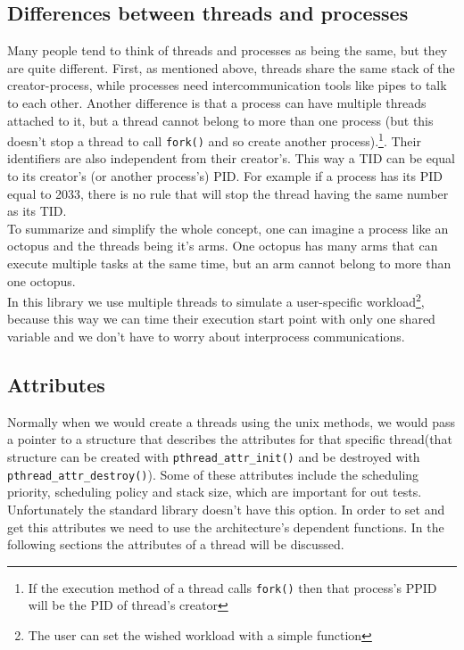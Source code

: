 \subsection{Differences between threads and processes} 
Many people tend to think of threads and processes as being the same, but they are quite different. First, as mentioned above, threads share the same stack of the creator-process, while processes need intercommunication tools like pipes to talk to each other. Another difference is that a process can have multiple threads attached to it, but a thread cannot belong to more than one process (but this doesn't stop a thread to call \texttt{fork()} and so create another process).\footnote{If the execution method of a thread calls \texttt{fork()} then that process's PPID will be the PID of thread's creator}. Their identifiers are also independent from their creator's. This way a TID can be equal to its creator's (or another process's) PID. For example if a process has its PID equal to 2033, there is no rule that will stop the thread having the same number as its TID. \\
To summarize and simplify the whole concept, one can imagine a process like an octopus and the threads being it's arms. One octopus has many arms that can execute multiple tasks at the same time, but an arm cannot belong to more than one octopus.\\
In this library we use multiple threads to simulate a user-specific workload\footnote{The user can set the wished workload with a simple function}, because this way we can time their execution start point with only one shared variable and we don't have to worry about interprocess communications. 
\subsection{Attributes}
Normally when we would create a threads using the unix methods, we would pass a pointer to a
structure that describes the attributes for that specific thread(that structure can be created with 
\texttt{pthread\_attr\_init()} and be destroyed with \texttt{pthread\_attr\_destroy()}). Some of these attributes include the 
scheduling priority, scheduling policy and stack size, which are important for out tests. 
Unfortunately the standard library doesn't have this option. In order to set and get this attributes
we need to use the architecture's dependent functions. In the following sections the attributes of a thread will be discussed.
